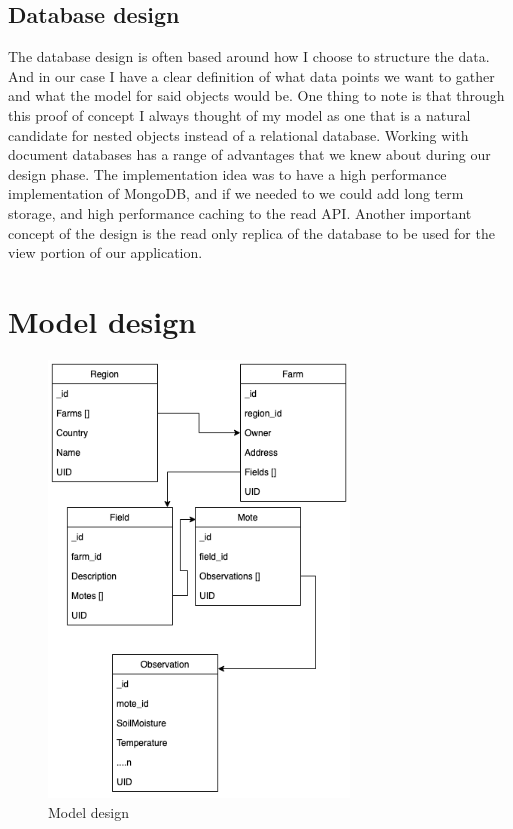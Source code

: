 \documentclass[]{uiophd}
\begin{document}
\subsection{Database design}
The database design is often based around how I choose to structure the data. And in our case I have a clear definition of what data points we want to gather and what the model for said objects would be. One thing to note is that through this proof of concept I always thought of my model as one that is a natural candidate for nested objects instead of a relational database. Working with document databases has a range of advantages that we knew about during our design phase. The implementation idea was to have a high performance implementation of MongoDB, and if we needed to we could add long term storage, and high performance caching to the read API. Another important concept of the design is the read only replica of the database to be used for the view portion of our application.
\section{Model design}
\begin{figure}[h]
\caption{Model design}
\centering
\includegraphics[width=8cm]{model_golden.png}
\end{figure}
\end{document}
